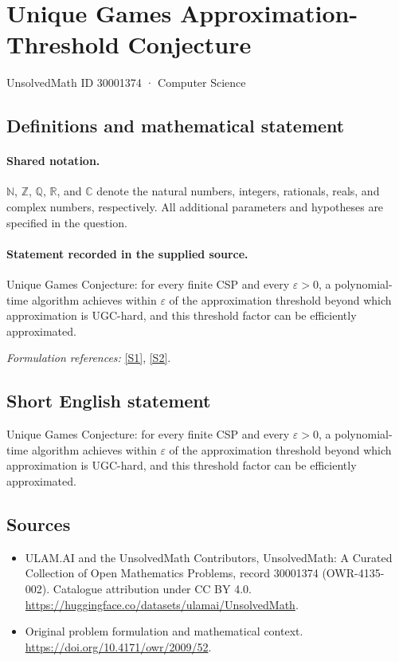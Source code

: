 \documentclass[11pt]{article}
\newcommand{\sref}[2]{\hyperlink{source:#1:#2}{[S#2]}}
\begin{document}
\setcounter{section}{30001373}
\section{Unique Games Approximation-Threshold Conjecture}\label{30001374}
{\small UnsolvedMath ID 30001374 · Computer Science}
\subsection{Definitions and mathematical statement}

\paragraph{Shared notation.}$\mathbb N$, $\mathbb Z$, $\mathbb Q$, $\mathbb R$, and $\mathbb C$ denote the natural numbers, integers, rationals, reals, and complex numbers, respectively. All additional parameters and hypotheses are specified in the question.


\paragraph{Statement recorded in the supplied source.}
Unique Games Conjecture: for every finite CSP and every $\varepsilon>0$, a polynomial-time algorithm achieves within $\varepsilon$ of the approximation threshold beyond which approximation is UGC-hard, and this threshold factor can be efficiently approximated.
\par\smallskip\textit{Formulation references:} \sref{30001374}{1}, \sref{30001374}{2}.
\subsection{Short English statement}
Unique Games Conjecture: for every finite CSP and every $\varepsilon>0$, a polynomial-time algorithm achieves within $\varepsilon$ of the approximation threshold beyond which approximation is UGC-hard, and this threshold factor can be efficiently approximated.
\subsection{Sources}
\begin{itemize}
\item[\hypertarget{source:30001374:1}{S1}] ULAM.AI and the UnsolvedMath Contributors, UnsolvedMath: A Curated Collection of Open Mathematics Problems, record 30001374 (OWR-4135-002). Catalogue attribution under CC BY 4.0.
\url{https://huggingface.co/datasets/ulamai/UnsolvedMath}.
\item[\hypertarget{source:30001374:2}{S2}] Original problem formulation and mathematical context.
\url{https://doi.org/10.4171/owr/2009/52}.
\end{itemize}
\label{end:30001374}
\end{document}
